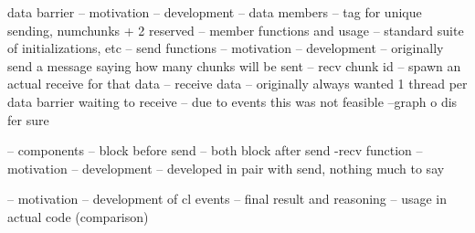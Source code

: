 \documentclass{article}
\begin{document}



 data barrier
    -- motivation
    -- development
    -- data members
        -- tag for unique sending, numchunks + 2 reserved
    -- member functions and usage
        -- standard suite of initializations, etc
        -- send functions
            -- motivation
            -- development
                -- originally send a message saying how many chunks will be sent
                -- recv chunk id
                -- spawn an actual receive for that data
                -- receive data
                -- originally always wanted 1 thread per data barrier waiting to receive
                    -- due to events this was not feasible
                --graph o dis fer sure
                
            -- components
            -- block before send
            -- both block after send
        -recv function
            -- motivation
            -- development
                -- developed in pair with send, nothing much to say




    -- motivation
    -- development of cl events
    -- final result and reasoning
    -- usage in actual code (comparison)




    
\end{document}

